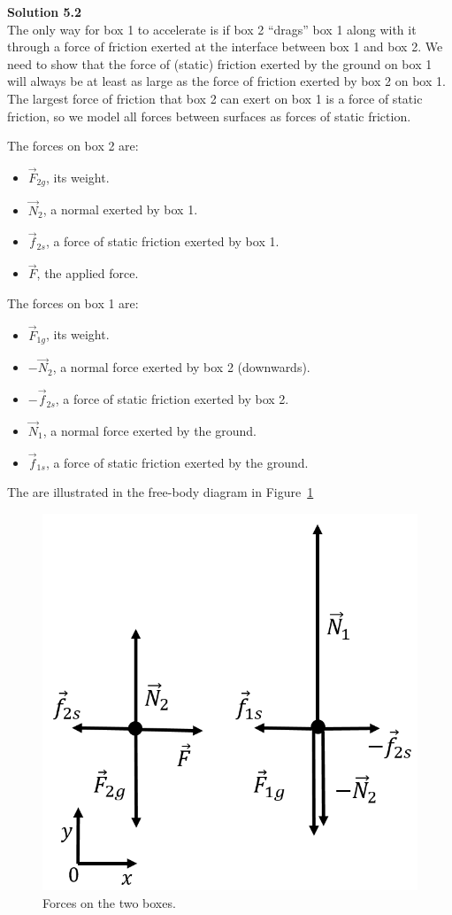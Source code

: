 \begin{framed}
\textbf{Solution 5.2}\\
The only way for box 1 to accelerate is if box 2 ``drags'' box 1 along with it through a force of friction exerted at the interface between box 1 and box 2. We need to show that the force of (static) friction exerted by the ground on box 1 will always be at least as large as the force of friction exerted by box 2 on box 1. The largest force of friction that box 2 can exert on box 1 is a force of static friction, so we model all forces between surfaces as forces of static friction.

The forces on box 2 are:

\begin{itemize}
\item $\vec F_{2g}$, its weight.
\item $\vec N_2$, a normal exerted by box 1.
\item $\vec f_{2s}$, a force of static friction exerted by box 1.
\item $\vec F$, the applied force.
\end{itemize}

The forces on box 1 are:

\begin{itemize}
\item $\vec F_{1g}$, its weight.
\item $-\vec N_2$, a normal force exerted by box 2 (downwards).
\item $-\vec f_{2s}$, a force of static friction exerted by box 2.
\item $\vec N_1$, a normal force exerted by the ground.
\item $\vec f_{1s}$, a force of static friction exerted by the ground.
\end{itemize}

The are illustrated in the free-body diagram in Figure~\ref{fig:newtonslaws:twoboxes_fbd}

\begin{figure}[!htbp]
\centering
\includegraphics[width=0.4\linewidth]{files/twoboxes_fbd-dc08f10420c8f2ae6d0e00a989fceb10.png}
\caption[]{Forces on the two boxes.}
\label{fig:newtonslaws:twoboxes_fbd}
\end{figure}


\end{framed}

